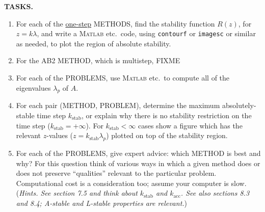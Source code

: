 \documentclass[11pt]{amsart}
\newcommand{\Matlab}{\textsc{Matlab}\xspace}
\begin{document}
\bigskip
\noindent \textbf{TASKS.}
\renewcommand{\labelenumi}{\textbf{(\alph{enumi})}\,}
\begin{enumerate}
\item For each of the \underline{one-step} METHODS, find the stability function $R(z)$, for $z=k\lambda$, and write a \Matlab etc.~code, using \texttt{contourf} or \texttt{imagesc} or similar as needed, to plot the region of absolute stability.
\item For the AB2 METHOD, which is multistep, FIXME
\item For each of the PROBLEMS, use \Matlab etc.~to compute all of the eigenvalues $\lambda_p$ of $A$.
\newcommand{\kstab}{k_{\text{stab}}}
\item For each pair (METHOD, PROBLEM), determine the maximum absolutely-stable time step $\kstab$, or explain why there is no stability restriction on the time step ($\kstab=+\infty$).  For $\kstab<\infty$ cases show a figure which has the relevant $z$-values ($z=\kstab \lambda_p$) plotted on top of the stability region.
\item For each of the PROBLEMS, give expert advice: which METHOD is best and why?  For this question think of various ways in which a given method does or does not preserve ``qualities'' relevant to the particular problem.  Computational cost is a consideration too; assume your computer is slow.  (\emph{Hints. See section 7.5 and think about $\kstab$ and $k_{\text{acc}}$.  See also sections 8.3 and 8.4; A-stable and L-stable properties are relevant.})
\end{enumerate}

\vfill
\end{document}
